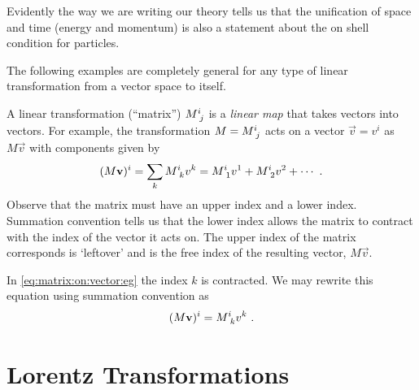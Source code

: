 \documentclass[12pt, oneside]{report}    %
\let\oldsection\section
\def\section{%
  \setcounter{sidenote}{1}%
  \oldsection
}
\begin{document}
Evidently the way we are writing our theory tells us that the unification of space and time (energy and momentum) is also a statement about the on shell condition for particles. 


The following examples are completely general for any type of linear transformation from a vector space to itself. 
\begin{example}
A linear transformation (``matrix'') $M\aij{i}{j}$ is a \emph{linear map} that takes vectors into vectors. For example, the transformation $M=M\aij{i}{j}$ acts on a vector $\vec{v} = v^i$ as $M\vec{v}$ with components given by
\begin{align}
    (M\vec{v})^i = \sum_k M\aij{i}{k}v^k = M\aij{i}{1}v^1 + M\aij{i}{2}v^2 + \cdots \ .
    \label{eq:matrix:on:vector:eg}
\end{align}
Observe that the matrix must have an upper index and a lower index. Summation convention tells us that the lower index allows the matrix to contract with the  index of the vector it acts on. The upper index of the matrix corresponds is `leftover' and is the free index of the resulting vector, $M\vec{v}$.
\end{example}


\begin{example}
In \eqref{eq:matrix:on:vector:eg} the index $k$ is contracted. We may rewrite this equation using summation convention as
\begin{align}
    (M\vec{v})^i = M\aij{i}{k}v^k \ .
\end{align}
\end{example}




\section{Lorentz Transformations}\label{sec:Lorentz:transformations}
\end{document}
